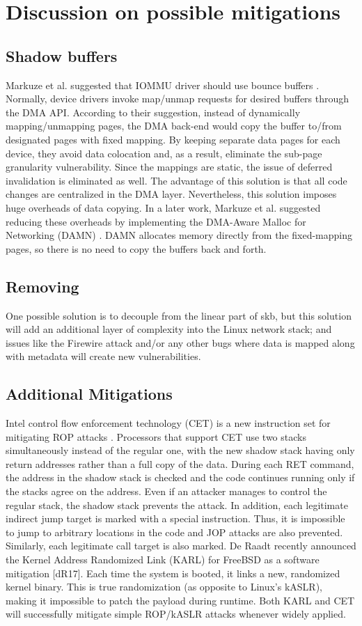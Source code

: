 \section{Discussion on possible mitigations}
\subsection{Shadow buffers}
 Markuze et al. suggested that IOMMU driver should use bounce buffers \cite{MMT16}. Normally, device drivers invoke map/unmap requests for desired buffers through the DMA API. According to their suggestion, instead of dynamically mapping/unmapping pages, the DMA back-end would copy the buffer to/from designated pages with fixed mapping. By keeping separate data pages for each device, they avoid data colocation and, as a result, eliminate the sub-page granularity vulnerability. Since the mappings are static, the issue of deferred invalidation is eliminated as well. The advantage of this solution is that all code changes are centralized in the DMA layer. Nevertheless, this solution imposes huge overheads of data copying. In a later work, Markuze et al. suggested reducing these overheads by implementing the DMA-Aware Malloc for Networking (DAMN) \cite{MSMT18}. DAMN allocates memory directly from the fixed-mapping pages, so there is no need to copy the buffers back and forth. 
\subsection{Removing \shinfo}
One possible solution is to decouple \shinfo from the linear part of skb, but this solution will add an additional layer of complexity into the Linux network stack; and issues like the Firewire attack and/or any other bugs where data is mapped along with metadata will create new vulnerabilities. 
\subsection{Additional Mitigations}
Intel control flow enforcement technology (CET) is a new instruction set for mitigating ROP attacks \cite{Int17}. Processors that support CET use two stacks simultaneously instead of the regular one, with the new shadow stack having only return addresses rather than a full copy of the data. During each RET command, the address in the shadow stack is checked and the code continues running only if the stacks agree on the address. Even if an attacker manages to control the regular stack, the shadow stack prevents the attack. In addition, each legitimate indirect jump target is marked with a special instruction. Thus, it is impossible to jump to arbitrary locations in the code and JOP attacks are also prevented. Similarly, each legitimate call target is also marked. De Raadt recently announced the Kernel Address Randomized Link (KARL) for FreeBSD as a software mitigation [dR17]. Each time the system is booted, it links a new, randomized kernel binary. This is true randomization (as opposite to Linux’s kASLR), making it impossible to patch the payload during runtime. Both KARL and CET will successfully mitigate simple ROP/kASLR attacks whenever widely applied.